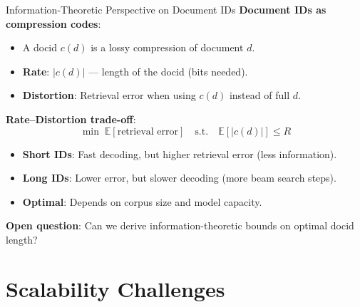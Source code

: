 \documentclass[aspectratio=169,11pt]{beamer}
\begin{document}
\begin{frame}{Information-Theoretic Perspective on Document IDs}
\textbf{Document IDs as compression codes}:

\vspace{0.3cm}
\begin{itemize}
    \item A docid $c(d)$ is a lossy compression of document $d$.
    \item \textbf{Rate}: $|c(d)|$ --- length of the docid (bits needed).
    \item \textbf{Distortion}: Retrieval error when using $c(d)$ instead of full $d$.
\end{itemize}

\vspace{0.3cm}
\textbf{Rate--Distortion trade-off}:
\[
\min \;\mathbb{E}[\text{retrieval error}] \quad\text{s.t.}\quad \mathbb{E}[|c(d)|] \leq R
\]

\vspace{0.3cm}
\begin{itemize}
    \item \textbf{Short IDs}: Fast decoding, but higher retrieval error (less information).
    \item \textbf{Long IDs}: Lower error, but slower decoding (more beam search steps).
    \item \textbf{Optimal}: Depends on corpus size and model capacity.
\end{itemize}

\vspace{0.2cm}
\textbf{Open question}: Can we derive information-theoretic bounds on optimal docid length?
\end{frame}


\section{Scalability Challenges}
\end{document}

